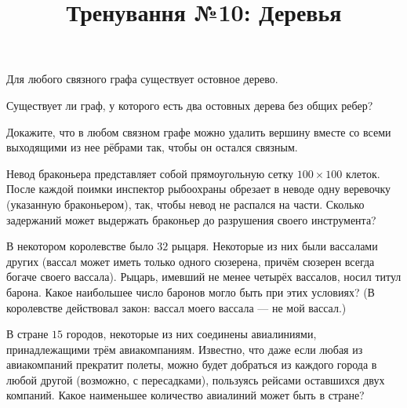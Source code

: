 



\title{Тренування №10: Деревья}
\maketitle

\begin{problem}
	Для любого связного графа существует остовное дерево.
\end{problem}

\begin{problem}
	Существует ли граф, у которого есть два остовных дерева без общих ребер?
\end{problem}

\begin{problem}
	Докажите, что в любом связном графе можно удалить вершину вместе со всеми выходящими из нее рёбрами так, чтобы он остался связным.
\end{problem}

\begin{problem}
	Невод браконьера представляет собой прямоугольную сетку $100 \times 100$ клеток. После каждой поимки инспектор рыбоохраны обрезает в неводе одну веревочку (указанную браконьером), так, чтобы невод не распался на части. Сколько задержаний может выдержать браконьер до разрушения своего инструмента?
\end{problem}

\begin{problem}
	В некотором королевстве было $32$ рыцаря. Некоторые из них были вассалами других (вассал может иметь только одного сюзерена, причём сюзерен всегда богаче своего вассала). Рыцарь, имевший не менее четырёх вассалов, носил титул барона. Какое наибольшее число баронов могло быть при этих условиях? (В королевстве действовал закон: \guillemotleft вассал моего вассала --- не мой вассал\guillemotright.)
\end{problem}

\begin{problem}
	В стране $15$ городов, некоторые из них соединены авиалиниями, принадлежащими трём авиакомпаниям. Известно, что даже если любая из авиакомпаний прекратит полеты, можно будет добраться из каждого города в любой другой (возможно, с пересадками), пользуясь рейсами оставшихся двух компаний. Какое наименьшее количество авиалиний может быть в стране?
\end{problem}

